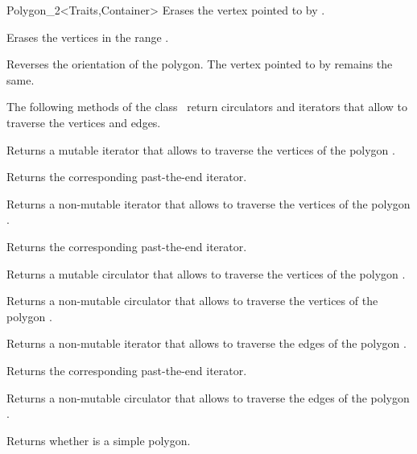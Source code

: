 \begin{ccClassTemplate}{Polygon_2<Traits,Container>}
    { Erases the vertex pointed to by .}

    { Erases the vertices in the range \ccStyle{[first, last)}.}

    { Reverses the orientation of the polygon. The vertex pointed to by
       remains the same. }

The following methods of the class \ccClassName\ return
circulators and iterators that allow to traverse the vertices and edges.

    { Returns a mutable iterator that allows to traverse the vertices of
      the polygon .}

    { Returns the corresponding past-the-end iterator. }

    { Returns a non-mutable iterator that allows to traverse the vertices of
      the polygon .}

    { Returns the corresponding past-the-end iterator. }

    { Returns a mutable circulator that allows to traverse the vertices of
      the polygon .}

    { Returns a non-mutable circulator that allows to traverse the vertices of
      the polygon .}

    { Returns a non-mutable iterator that allows to traverse the edges of
      the polygon .}

    { Returns the corresponding past-the-end iterator. }

    { Returns a non-mutable circulator that allows to traverse the edges of
      the polygon .}


    { Returns whether  is a simple polygon.}


\end{ccClassTemplate}
